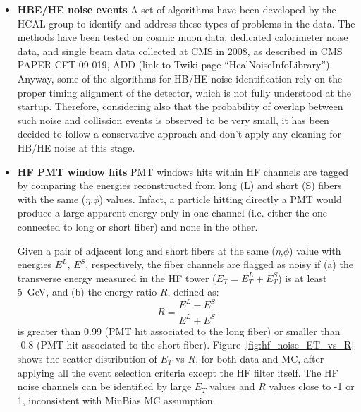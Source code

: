 \begin{itemize}
%
\item{\bf HBE/HE noise events} A set of algorithms have been developed by the HCAL group to 
identify and address these types of problems in the data. The methods have been tested on cosmic muon data, 
dedicated calorimeter noise data, and single beam data collected at CMS in 2008, 
as described in CMS PAPER CFT-09-019, ADD (link to Twiki page ``HcalNoiseInfoLibrary''). 
Anyway, some of the algorithms for HB/HE noise identification rely on the proper 
timing alignment of the detector, which is not fully understood at the startup.
Therefore, considering also that the probability of overlap between such noise and 
collission events is observed to be very small, it has been decided to follow a conservative approach and 
don't apply any cleaning for HB/HE noise at this stage.
%
\item{\bf HF PMT window hits} PMT windows hits within HF channels are tagged by comparing 
the energies reconstructed from long (L) and short (S) fibers with the same ($\eta$,$\phi$) values. 
Infact, a particle hitting directly a PMT would produce a large apparent energy only in one channel 
(i.e. either the one connected to long or short fiber) and none in the other.

Given a pair of adjacent long and short fibers at the same ($\eta$,$\phi$) value 
with energies $E^L$, $E^S$, respectively, the fiber channels are flagged as noisy if 
(a) the transverse energy measured in the HF tower ($E_T=E_T^L+E_T^S$) is at least 5~GeV, 
and (b) the energy ratio $R$, defined as:
%
\begin{equation}
R = \frac{E^L - E^S}{E^L + E^S}
\end{equation}
%
is greater than 0.99 (PMT hit associated to the long fiber) 
or smaller than -0.8 (PMT hit associated to the short fiber). 
Figure~\ref{fig:hf_noise_ET_vs_R} shows the scatter distribution of $E_T$ vs $R$, 
for both data and MC, after applying all the event selection criteria except 
the HF filter itself. The HF noise channels can be identified by 
large $E_T$ values and $R$ values close to -1 or 1, 
inconsistent with MinBias MC assumption.



\end{itemize}

